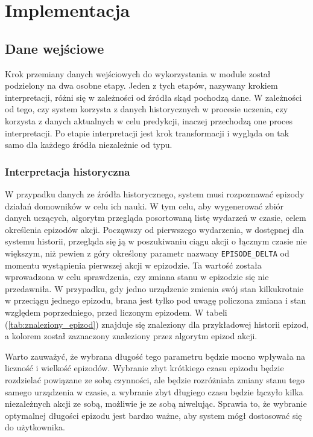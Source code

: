 \chapter{Implementacja}

\section{Dane wejściowe}
Krok przemiany danych wejściowych do wykorzystania w module został podzielony na dwa osobne etapy. Jeden z tych etapów, nazywany krokiem interpretacji, różni się w zależności od źródła skąd pochodzą dane. W zależności od tego, czy system korzysta z danych historycznych w procesie uczenia, czy korzysta z danych aktualnych w celu predykcji, inaczej przechodzą one proces interpretacji. Po etapie interpretacji jest krok transformacji i wygląda on tak samo dla każdego źródła niezależnie od typu.


\subsection{Interpretacja historyczna}
W przypadku danych ze źródła historycznego, system musi rozpoznawać epizody działań domowników w celu ich nauki. W tym celu, aby wygenerować zbiór danych uczących, algorytm przegląda posortowaną listę wydarzeń w czasie, celem określenia epizodów akcji. Począwszy od pierwszego wydarzenia, w dostępnej dla systemu historii, przegląda się ją w poszukiwaniu ciągu akcji o łącznym czasie nie większym, niż pewien z góry określony parametr nazwany \verb+EPISODE_DELTA+ od momentu wystąpienia pierwszej akcji w epizodzie. Ta wartość została wprowadzona w celu sprawdzenia, czy zmiana stanu w epizodzie się nie przedawniła. W przypadku, gdy jedno urządzenie zmienia swój stan kilkukrotnie w przeciągu jednego epizodu, brana jest tylko pod uwagę policzona zmiana i stan względem poprzedniego, przed liczonym epizodem. W tabeli (\ref{tab:znaleziony_epizod}) znajduje się znaleziony dla przykładowej historii epizod, a kolorem został zaznaczony znaleziony przez algorytm epizod akcji. 

Warto zauważyć, że wybrana długość tego parametru będzie mocno wpływała na liczność i wielkość epizodów. Wybranie zbyt krótkiego czasu epizodu będzie rozdzielać powiązane ze sobą czynności, ale będzie rozróżniała zmiany stanu tego samego urządzenia w czasie, a wybranie zbyt długiego czasu będzie łączyło kilka niezależnych akcji ze sobą, możliwie je ze sobą niwelując. Sprawia to, że wybranie optymalnej długości epizodu jest bardzo ważne, aby system mógł dostosować się do użytkownika.

